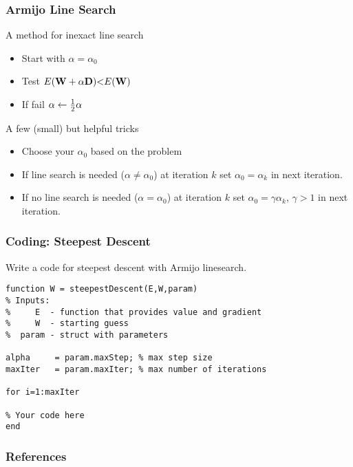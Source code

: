 \documentclass[12pt,fleqn,handout]{beamer}
\begin{document}
\begin{frame}\frametitle{Armijo Line Search}

A method for inexact line search


\begin{itemize}
\item Start with $\alpha = \alpha_0$
\item Test $ E({\bf W} + \alpha {\bf D}) {<} E({\bf W})$
\item If fail $\alpha \leftarrow {\frac 12} \alpha$
\end{itemize}

\bigskip
\pause

A few (small) but helpful tricks
\begin{itemize}
\item Choose your $\alpha_0$ based on the problem
\item If line search is needed ($\alpha\not=\alpha_0$) at iteration $k$ set $\alpha_0 = \alpha_k$ in next iteration.
\item If no line search is needed ($\alpha =\alpha_0$) at iteration $k$ set $\alpha_0 = \gamma\alpha_k$, $\gamma>1$ in next iteration.
\end{itemize}


\end{frame}


\begin{frame}[fragile]\frametitle{Coding: Steepest Descent }

Write a code for steepest descent with Armijo linesearch.

\begin{verbatim}
function W = steepestDescent(E,W,param)
% Inputs:
%     E  - function that provides value and gradient
%     W  - starting guess
%  param - struct with parameters

alpha     = param.maxStep; % max step size
maxIter   = param.maxIter; % max number of iterations

for i=1:maxIter

% Your code here
end
\end{verbatim}

\end{frame}



\begin{frame}[allowframebreaks]
	\frametitle{References}



\end{frame}
\end{document}
